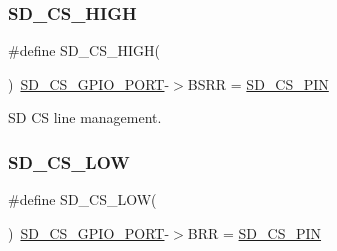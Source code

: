\subsubsection{\texorpdfstring{SD\_CS\_HIGH}{SD\_CS\_HIGH}}
{\footnotesize\ttfamily \#define S\+D\+\_\+\+C\+S\+\_\+\+H\+I\+GH(\begin{DoxyParamCaption}{ }\end{DoxyParamCaption})~\mbox{\hyperlink{group___s_t_m32_f1_x_x___n_u_c_l_e_o___l_o_w___l_e_v_e_l___exported___constants_gaaaff9bd4922137edd642571ec1cafda3}{S\+D\+\_\+\+C\+S\+\_\+\+G\+P\+I\+O\+\_\+\+P\+O\+RT}}-\/$>$B\+S\+RR = \mbox{\hyperlink{group___s_t_m32_f1_x_x___n_u_c_l_e_o___l_o_w___l_e_v_e_l___exported___constants_ga04d57a6c18b2d5e81f31093e58ed0c62}{S\+D\+\_\+\+C\+S\+\_\+\+P\+IN}}}



SD CS line management. 

\mbox{\label{group___s_t_m32_f1_x_x___n_u_c_l_e_o___l_o_w___l_e_v_e_l___exported___macros_gaac4b728222e9597d36fcc079324da267}} 
\subsubsection{\texorpdfstring{SD\_CS\_LOW}{SD\_CS\_LOW}}
{\footnotesize\ttfamily \#define S\+D\+\_\+\+C\+S\+\_\+\+L\+OW(\begin{DoxyParamCaption}{ }\end{DoxyParamCaption})~\mbox{\hyperlink{group___s_t_m32_f1_x_x___n_u_c_l_e_o___l_o_w___l_e_v_e_l___exported___constants_gaaaff9bd4922137edd642571ec1cafda3}{S\+D\+\_\+\+C\+S\+\_\+\+G\+P\+I\+O\+\_\+\+P\+O\+RT}}-\/$>$B\+RR = \mbox{\hyperlink{group___s_t_m32_f1_x_x___n_u_c_l_e_o___l_o_w___l_e_v_e_l___exported___constants_ga04d57a6c18b2d5e81f31093e58ed0c62}{S\+D\+\_\+\+C\+S\+\_\+\+P\+IN}}}

